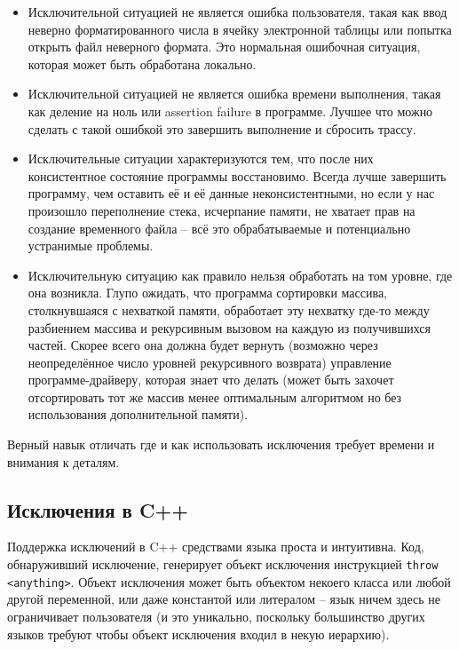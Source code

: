 \documentclass[a4paper,12pt,oneside]{article}
\begin{document}
\begin{itemize}
\item
Исключительной ситуацией не является ошибка пользователя, такая как ввод неверно форматированного числа в ячейку электронной таблицы или попытка открыть файл неверного формата. Это нормальная ошибочная ситуация, которая может быть обработана локально.
\item
Исключительной ситуацией не является ошибка времени выполнения, такая как деление на ноль или assertion failure в программе. Лучшее что можно сделать с такой ошибкой это завершить выполнение и сбросить трассу.
\item
Исключительные ситуации характеризуются тем, что после них консистентное состояние программы восстановимо. Всегда лучше завершить программу, чем оставить её и её данные неконсистентными, но если у нас произошло переполнение стека, исчерпание памяти, не хватает прав на создание временного файла -- всё это обрабатываемые и потенциально устранимые проблемы.
\item
Исключительную ситуацию как правило нельзя обработать на том уровне, где она возникла. Глупо ожидать, что программа сортировки массива, столкнувшаяся с нехваткой памяти, обработает эту нехватку где-то между разбиением массива и рекурсивным вызовом на каждую из получившихся частей. Скорее всего она должна будет вернуть (возможно через неопределённое число уровней рекурсивного возврата) управление программе-драйверу, которая знает что делать (может быть захочет отсортировать тот же массив менее оптимальным алгоритмом но без использования дополнительной памяти).
\end{itemize}

Верный навык отличать где и как использовать исключения требует времени и внимания к деталям.

\pagebreak
\subsection{Исключения в C++}\label{CppExceptions}

Поддержка исключений в C++ средствами языка проста и интуитивна. Код, обнаруживший исключение, генерирует объект исключения инструкцией \lstinline!throw <anything>!. Объект исключения может быть объектом некоего класса или любой другой переменной, или даже константой или литералом -- язык ничем здесь не ограничивает пользователя (и это уникально, поскольку большинство других языков требуют чтобы объект исключения входил в некую иерархию). 
\end{document}

